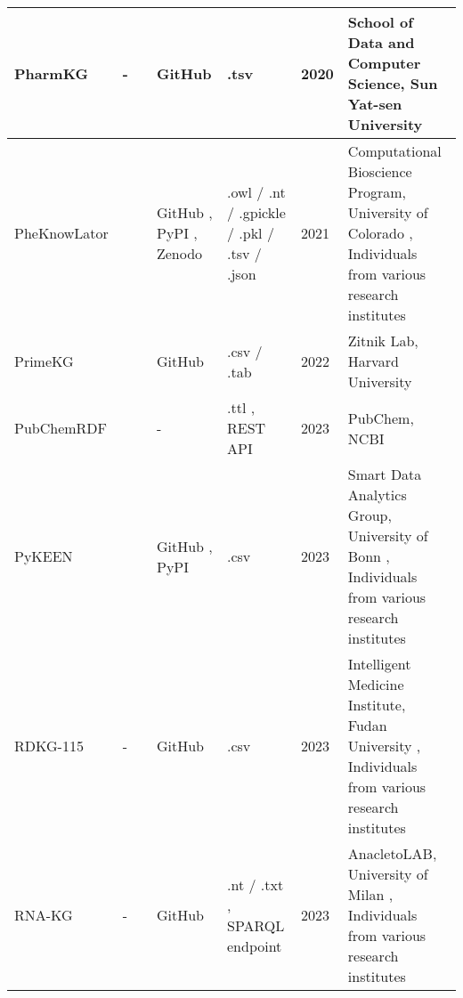 \documentclass{article}
\begin{document}
\begin{landscape}
\begin{xltabular}{\textwidth}{p{3cm}|p{2.2cm}|p{2.2cm}|p{2.2cm}|p{2.2cm}|p{1cm}|p{6cm}}
PharmKG
&
-
&
\cite{pharmkg_publication}
&
GitHub
\cite{pharmkg_github}
&
.tsv
\cite{pharmkg_data}
&
2020
&
School of Data and Computer Science, Sun Yat-sen University
\cite{pharmkg_group}
\\


\hline


PheKnowLator
&
\cite{pheknowlator_website}
&
\cite{pheknowlator_publication1}
\cite{pheknowlator_publication2}
&
GitHub
\cite{pheknowlator_github},
PyPI
\cite{pheknowlator_pypi},
Zenodo
\cite{pheknowlator_zenodo}
&
.owl / .nt / .gpickle / .pkl / .tsv / .json
\cite{pheknowlator_data1}
\cite{pheknowlator_data2}
\cite{pheknowlator_data3}
&
2021
&
Computational Bioscience Program, University of Colorado
\cite{pheknowlator_group},
Individuals from various research institutes
\\


\hline


PrimeKG
&
\cite{primekg_website}
&
\cite{primekg_publication}
&
GitHub
\cite{primekg_github}
&
.csv / .tab
\cite{primekg_data}
&
2022
&
Zitnik Lab, Harvard University
\cite{primekg_group}
\\


\hline


PubChemRDF
&
\cite{pubchemrdf_website}
&
\cite{pubchemrdf_publication1}
\cite{pubchemrdf_publication2}
&
-
&
.ttl
\cite{pubchemrdf_data1}
\cite{pubchemrdf_data2},
REST API
\cite{pubchemrdf_data3}
&
2023
&
PubChem, NCBI
\cite{pubchemrdf_group}
\\


\hline


PyKEEN
&
\cite{pykeen_website}
&
\cite{pykeen_publication1}
\cite{pykeen_publication2}
\cite{pykeen_publication3}
&
GitHub
\cite{pykeen_github},
PyPI
\cite{pykeen_pypi}
&
.csv
\cite{pykeen_data1}
\cite{pykeen_data2}
&
2023
&
Smart Data Analytics Group, University of Bonn
\cite{pykeen_group},
Individuals from various research institutes
\\


\hline


RDKG-115
&
-
&
\cite{rdkg115_publication}
&
GitHub
\cite{rdkg115_github}
&
.csv
\cite{rdkg115_data1}
\cite{rdkg115_data2}
&
2023
&
Intelligent Medicine Institute, Fudan University
\cite{rdkg115_group},
Individuals from various research institutes
\\


\hline


RNA-KG
&
-
&
\cite{rnakg_publication1}
\cite{rnakg_publication2}
&
GitHub
\cite{rnakg_github}
&
.nt / .txt
\cite{rnakg_data1},
SPARQL endpoint
\cite{rnakg_data2}
&
2023
&
AnacletoLAB, University of Milan
\cite{rnakg_group},
Individuals from various research institutes
\\



\end{xltabular}
\end{landscape}
\end{document}
